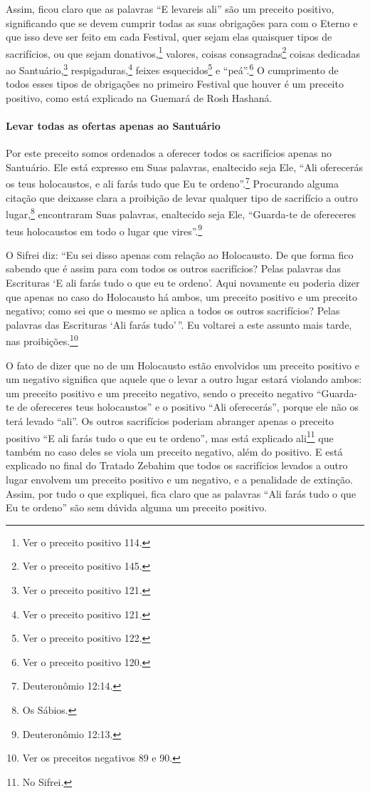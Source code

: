 Assim, ficou claro que as palavras ``E levareis ali'' são um preceito
positivo, significando que se devem cumprir todas as suas obrigações
para com o Eterno e que isso deve ser feito em cada Festival, quer sejam elas
quaisquer tipos de sacrifícios, ou que sejam donativos,\footnote{Ver o preceito positivo 114.} valores, coisas consagradas\footnote{Ver o preceito positivo 145.} coisas dedicadas ao
Santuário,\footnote{Ver o preceito positivo 121.} respigaduras,\footnote{Ver o preceito positivo 121.}
feixes esquecidos\footnote{Ver o preceito positivo 122.} e ``peá''.\footnote{Ver o preceito positivo 120.}
O cumprimento de todos esses tipos de obrigações no primeiro Festival
que houver é um preceito positivo, como está explicado na Guemará de
Rosh Hashaná.

\paragraph{Levar todas as ofertas apenas ao Santuário}

Por este preceito somos ordenados a oferecer todos os sacrifícios apenas
no Santuário. Ele está expresso em Suas palavras, enaltecido seja Ele,
``Ali oferecerás os teus holocaustos, e ali farás tudo que Eu te
ordeno''.\footnote{Deuteronômio 12:14.} Procurando alguma citação que deixasse
clara a proibição de levar qualquer tipo de sacrifício a outro
lugar,\footnote{Os Sábios.} encontraram Suas palavras, enaltecido seja
Ele, ``Guarda-te de ofereceres teus holocaustos em todo o lugar que
vires''.\footnote{Deuteronômio 12:13.}

O Sifrei diz: ``Eu sei disso apenas com relação ao Holocausto. De que
forma fico sabendo que é assim para com todos os outros sacrifícios?
Pelas palavras das Escrituras `E ali farás tudo o que eu te ordeno'.
Aqui novamente eu poderia dizer que apenas no caso do Holocausto há
ambos, um preceito positivo e um preceito negativo; como sei que o mesmo se aplica a todos os outros
sacrifícios? Pelas palavras das Escrituras `Ali farás tudo'\,''. Eu
voltarei a este assunto mais tarde, nas proibições.\footnote{Ver os preceitos negativos 89 e 90.}

O fato de dizer que no de um Holocausto estão envolvidos um preceito
positivo e um negativo significa que aquele que o levar a outro lugar
estará violando ambos: um preceito positivo e um preceito negativo,
sendo o preceito negativo ``Guarda-te de ofereceres teus holocaustos'' e
o positivo ``Ali oferecerás'', porque ele não os terá levado ``ali''. Os outros
sacrifícios poderiam abranger apenas o preceito positivo ``E ali farás tudo o que eu te
ordeno'', mas está explicado ali\footnote{No Sifrei.} que também no caso deles se
viola um preceito negativo, além do positivo. E está explicado no final do Tratado Zebahim que todos
os sacrifícios levados a outro lugar envolvem um preceito positivo e um
negativo, e a penalidade de extinção. Assim, por
tudo o que expliquei, fica claro que as palavras ``Ali farás tudo o que
Eu te ordeno'' são sem dúvida alguma um preceito positivo.

